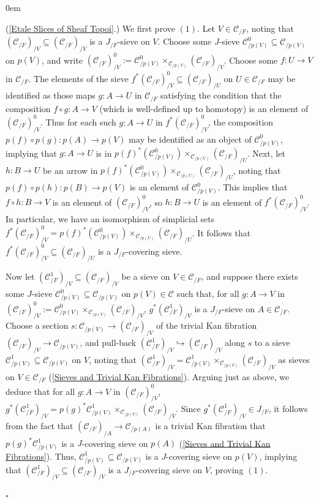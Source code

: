 \documentclass[10pt]{article}
\newcommand{\C}{\mathcal C}
\renewcommand{\qed}{\hfill$\square$}
\renewenvironment{proof}{\begin{addmargin}[1em]{0em}\begin{newproof}}{\end{newproof}\end{addmargin}\qed}
\theoremstyle{witharg}
\theoremstyle{witharg}
\theoremstyle{witharg2}
\begin{document}
\begin{proof} (\ref{Etale Slices of Sheaf Topoi}.) We first prove $(1)$. Let $V\in \C_{/F}$, noting that $(\C_{/F})_{/V}\subseteq (\C_{/F})_{/V}$ is a $J_{/F}$-sieve on $V$. Choose some $J$-sieve $\C^0_{/p(V)}\subseteq \C_{/p(V)}$ on $p(V)$, and write $(\C_{/F})^0_{/V}:=\C^{0}_{/p(V)}\times_{\C_{/p(V)}}(\C_{/F})_{/V}$. Choose some $f:U\rightarrow V$ in $\C_{/F}$. The elements of the sieve $f^*(\C_{/F})^0_{/V}\subseteq(\C_{/F})_{/U}$ on $U\in \C_{/F}$ may be identified as those maps $g:A\rightarrow U$ in $\C_{/F}$ satisfying the condition that the composition $f\circ g:A\rightarrow V$ (which is well-defined up to homotopy) is an element of $(\C_{/F})^0_{/V}$. Thus for each such $g:A\rightarrow U$ in $f^*(\C_{/F})^0_{/V}$, the composition $p(f)\circ p(g):p(A)\rightarrow p(V)$ may be identified as an object of $\C^{0}_{/p(V)}$, implying that $g:A\rightarrow U$ is in $p(f)^*(\C^{0}_{/p(V)})\times_{\C_{/p(U)}}(\C_{/F})_{/U}$. Next, let $h:B\rightarrow U$ be an arrow in $p(f)^*(\C^{0}_{/p(V)})\times_{\C_{/p(U)}}(\C_{/F})_{/U}$, noting that $p(f)\circ p(h):p(B)\rightarrow p(V)$ is an element of $\C^{0}_{/p(V)}$. This implies that $f\circ h:B\rightarrow V$ is an element of $(\C_{/F})^0_{/V}$, so $h:B\rightarrow U$ is an element of $f^*(\C_{/F})^0_{/V}$. In particular, we have an isomorphism of simplicial sets $f^*(\C_{/F})^0_{/V}=p(f)^*(\C^{0}_{/p(V)})\times_{\C_{/p(U)}}(\C_{/F})_{/U}$. It follows that $f^*(\C_{/F})^0_{/V}\subseteq (\C_{/F})_{/U}$ is a $J_{/F}$-covering sieve. 

Now let $(\C^1_{/F})_{/V}\subseteq (\C_{/F})_{/V}$ be a sieve on $V\in \C_{/F}$, and suppose there exists some $J$-sieve $\C^0_{/p(V)}\subseteq \C_{/p(V)}$ on $p(V)\in \C$ such that, for all $g:A\rightarrow V$ in $(\C_{/F})^0_{/V}:=\C^{0}_{/p(V)}\times_{\C_{/p(V)}}(\C_{/F})_{/V}$, $g^*(\C^1_{/F})_{/V}$ is a $J_{/F}$-sieve on $A\in \C_{/F}$. Choose a section $s:\C_{/p(V)}\rightarrow (\C_{/F})_{/V}$ of the trivial Kan fibration $(\C_{/F})_{/V}\rightarrow \C_{/p(V)}$, and pull-back $(\C^1_{/F})_{/V}\hookrightarrow (\C_{/F})_{/V}$ along $s$ to a sieve $\C^1_{/p(V)}\subseteq \C_{/p(V)}$ on $V$, noting that $(\C^1_{/F})_{/V}=\C^1_{/p(V)}\times_{\C_{/p(V)}}(\C_{/F})_{/V}$ as sieves on $V\in \C_{/F}$ (\ref{Sieves and Trivial Kan Fibrations}). Arguing just as above, we deduce that for all $g:A\rightarrow V$ in $(\C_{/F})^0_{/V}$, $g^*(\C^1_{/F})_{/V}=p(g)^*\C^1_{/p(V)}\times_{\C_{/p(V)}}(\C_{/F})_{/V}$. Since $g^*(\C^1_{/F})_{/V}\in J_{/F}$, it follows from the fact that $(\C_{/F})_{/A}\rightarrow \C_{/p(A)}$ is a trivial Kan fibration that $p(g)^*\C^1_{/p(V)}$ is a $J$-covering sieve on $p(A)$ (\ref{Sieves and Trivial Kan Fibrations}). Thus, $\C^1_{/p(V)}\subseteq \C_{/p(V)}$ is a $J$-covering sieve on $p(V)$, implying that $(\C^1_{/F})_{/V}\subseteq (\C_{/F})_{/V}$ is a $J_{/F}$-covering sieve on $V$, proving $(1)$. 




\end{proof}
\end{document}
